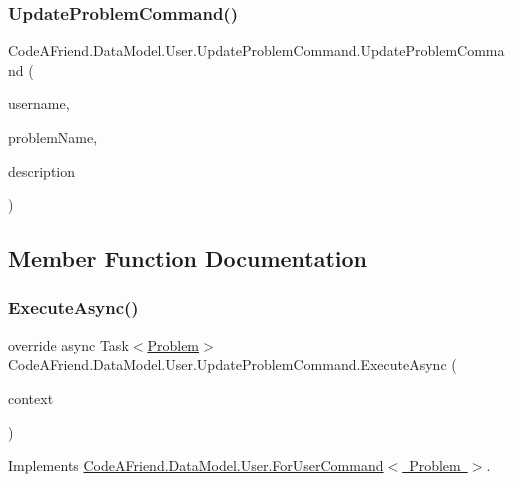 \subsubsection{\texorpdfstring{Update\+Problem\+Command()}{UpdateProblemCommand()}}
{\footnotesize\ttfamily Code\+A\+Friend.\+Data\+Model.\+User.\+Update\+Problem\+Command.\+Update\+Problem\+Command (\begin{DoxyParamCaption}\item[{string}]{username,  }\item[{string}]{problem\+Name,  }\item[{string}]{description }\end{DoxyParamCaption})}







\subsection{Member Function Documentation}
\mbox{\label{class_code_a_friend_1_1_data_model_1_1_user_1_1_update_problem_command_ab6deb9c81098f15347a52cff94661c4b}} 
\subsubsection{\texorpdfstring{Execute\+Async()}{ExecuteAsync()}}
{\footnotesize\ttfamily override async Task$<$\mbox{\hyperlink{class_code_a_friend_1_1_data_model_1_1_problem}{Problem}}$>$ Code\+A\+Friend.\+Data\+Model.\+User.\+Update\+Problem\+Command.\+Execute\+Async (\begin{DoxyParamCaption}\item[{Db\+Context}]{context }\end{DoxyParamCaption})\hspace{0.3cm}{\ttfamily [virtual]}}







Implements \mbox{\hyperlink{class_code_a_friend_1_1_data_model_1_1_user_1_1_for_user_command_aa9abf9da11dd2a573d8ed93bcf53f6df}{Code\+A\+Friend.\+Data\+Model.\+User.\+For\+User\+Command$<$ Problem $>$}}.



